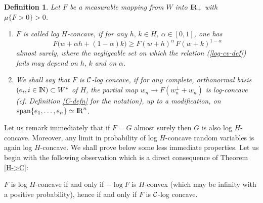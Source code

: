 \documentclass[12pt,a4paper]{book}
\newtheorem{definition}[theorem]{Definition}
\newcommand{\reals}{{\rm I\!R}}
\newcommand{\NN}{{\rm I\!N}}
\newcommand{\calC}{{\cal C}}
\newcommand{\R}{{\rm I\!R}}
\newcommand{\remark}{\noindent {\bf Remark:\ }}
\begin{document}
\begin{definition}
Let $F$ be a  measurable mapping  from $W$ into $\reals_+$ with
$\mu\{F>0\}>0$.
\begin{enumerate}
\item $F$ is  called log $H$-concave, if for any $h,\,k\in H$,
  $\alpha\in [0,1]$, one has
\begin{equation}
\label{log-cv-def}
F\bigl(w+\alpha h+(1-\alpha)k\bigr)\geq F(w+ h)^\alpha\,  F(w+k)^{1-\alpha}
\end{equation}
almost surely, where the negligeable set on which the relation
(\ref{log-cv-def})
fails may depend on $h,\,k$ and on $\alpha$.
\item We shall say that $F$ is $\calC$-log concave, if for any
  complete, orthonormal basis  $(e_i,i\in \NN)\subset W^*$ of $H$, the
  partial map $w_n\to F(w_n^\perp+w_n)$ is log-concave (cf. Definition
  \ref{C-defn} for the notation),  up to a
  modification,  on ${\rm span}\{e_1,\ldots,e_n\}\simeq \R^n$.
\end{enumerate}
\end{definition}

Let us  remark immediately that if $F=G$ almost surely then $G$ is also log
$H$-concave. Moreover, any limit in probability of log $H$-concave random
variables is again log $H$-concave. We shall prove below some less immediate
properties. Let us begin with the following observation which is a
direct consequence of Theorem \ref{H->C}:

\remark
\label{H-concave=C-concave}
$F$ is log $H$-concave if and only if $-\log F$ is $H$-convex
 (which may be infinity with a positive probability), hence if and
 only if $F$ is $\calC$-log concave.
\end{document}
